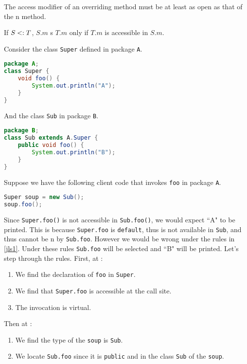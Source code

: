 \documentclass{article}
\begin{document}
\begin{definition}
The access modifier of an overriding method must be at least as open as that of the \override{}n method.
\end{definition}

\begin{definition}
If $S <: T$, $S.m$ \override{}s $T.m$ only if $T.m$ is accessible in $S.m$.
\end{definition}

\begin{example}
Consider the class \texttt{Super} defined in package \texttt{A}.
\begin{lstlisting}[escapechar=|, language=Java]
package A;
class Super {
    void foo() {
        System.out.println("A");
    }
}
\end{lstlisting}
And the class \texttt{Sub} in package \texttt{B}.
\begin{lstlisting}[escapechar=|, language=Java]
package B;
class Sub extends A.Super {
    public void foo() {
        System.out.println("B");
    }
}
\end{lstlisting}
Suppose we have the following client code that invokes \texttt{foo} in package \texttt{A}.
\begin{lstlisting}[escapechar=|, language = Java]
Super soup = new Sub();
soup.foo();
\end{lstlisting}
Since \texttt{Super.foo()} is not accessible in \texttt{Sub.foo()}, we would expect ``A" to be printed.
This is because \texttt{Super.foo} is \texttt{default}, thus is not available in \texttt{Sub}, and thus cannot be \override{}n by \texttt{Sub.foo}.
However we would be wrong under the rules in \ref{jls1}.
Under these rules \texttt{Sub.foo} will be selected and ``B" will be printed.
Let's step through the rules.
First, at \compiletime{}:
\begin{enumerate}
\item We find the \static{} declaration of \texttt{foo} in \texttt{Super}.
\item We find that \texttt{Super.foo} is accessible at the call site.
\item The invocation is virtual.
\end{enumerate}
Then at \runtime{}:
\begin{enumerate}
\item We find the \dynamic{} type of the \receiver{} \texttt{soup} is \texttt{Sub}.
\item We locate \texttt{Sub.foo} since it is \texttt{public} and in the class \texttt{Sub} of the \receiver{} \texttt{soup}.
\end{enumerate}
\end{example}
\end{document}
